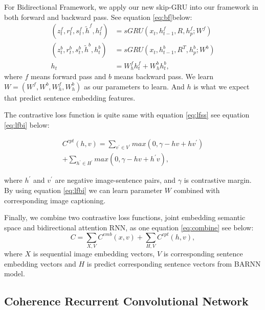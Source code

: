 \documentclass[11pt]{article}
\begin{document}
For Bidirectional Framework, we apply our new skip-GRU into our framework in both forward and backward pass. See equation \ref{eq:bf}below:
\begin{equation}
\begin{aligned}
(z_{t}^{f}, r_{t}^{f}, s_{t}^{f}, \tilde{h}^{f}, h_{t}^{f}) &= sGRU(x_{t}, h_{t-1}^{f}, R, h_{p}^{f}; W^{f})\\
(z_{t}^{b}, r_{t}^{b}, s_{t}^{b}, \tilde{h}^{b}, h_{t}^{b}) &= sGRU(x_{t}, h_{t-1}^{b}, R^{T}, h_{p}^{b}; W^{b})\\
h_{t} &= W_{h}^{f}h_{t}^{f} + W_{h}^{b}h_{t}^{b},
\end{aligned}
\label{eq:bf}
\end{equation} 
where $f$ means forward pass and $b$ means backward pass. We learn $W = (W^{f}, W^{b}, W_{h}^{f}, W_{h}^{b})$ as our parameters to learn. And $h$ is what we expect that predict sentence embedding features. 

The contrastive loss function is quite same with equation \ref{eq:lfss} see equation \ref{eq:lfbi} below:
\begin{small}
\begin{equation}
\begin{aligned}
C^{cpt}(h,v) = \sum_{v^{'} \in V^{'}} max(0, \gamma -hv + hv^{'}) \\
				 + \sum_{h^{'} \in H^{'}} max(0, \gamma -hv + h^{'}v),
\end{aligned}
\label{eq:lfbi}
\end{equation}
\end{small}
where $h^{'}$ and $v^{'}$ are negative image-sentence pairs, and $\gamma$ is contrastive margin. By using equation \ref{eq:lfbi} we can learn parameter $W$ combined with corresponding image captioning.

Finally, we combine two contrastive loss functions, joint embedding semantic space and bidirectional attention RNN, as one equation \ref{eq:combine} see below:
\begin{equation}
C = \sum_{X,V} C^{emb}(x,v) + \sum_{H,V}C^{cpt}(h,v),
\label{eq:combine}
\end{equation}
where $X$ is sequential image embedding vectors, $V$ is corresponding sentence embedding vectors and $H$ is predict corresponding sentence vectors from BARNN model.


\subsection{Coherence Recurrent Convolutional Network}
\end{document}
